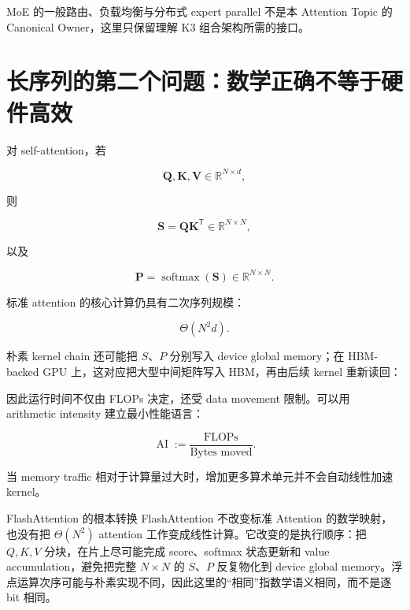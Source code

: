 \documentclass[profile=standard,twoside=false]{ipara-handbook}
\begin{document}
MoE 的一般路由、负载均衡与分布式 expert parallel 不是本 Attention Topic 的 Canonical Owner，这里只保留理解 K3 组合架构所需的接口。

\section{长序列的第二个问题：数学正确不等于硬件高效}

对 self-attention，若

$$
\boldsymbol{Q},\boldsymbol{K},\boldsymbol{V}\in\mathbb{R}^{N\times d},
$$

则

$$
\boldsymbol{S}=\boldsymbol{Q}\boldsymbol{K}^{\mathsf T}
\in\mathbb{R}^{N\times N},
$$

以及

$$
\boldsymbol{P}=\operatorname{softmax}(\boldsymbol{S})
\in\mathbb{R}^{N\times N}.
$$

标准 attention 的核心计算仍具有二次序列规模：

$$
\Theta(N^2d).
$$

朴素 kernel chain 还可能把 $S$、$P$ 分别写入 device global memory；在 HBM-backed GPU 上，这对应把大型中间矩阵写入 HBM，再由后续 kernel 重新读回：

\begin{processchain}
\end{processchain}

因此运行时间不仅由 FLOPs 决定，还受 data movement 限制。可以用 arithmetic intensity 建立最小性能语言：

$$
\operatorname{AI}
:=\frac{\text{FLOPs}}{\text{Bytes moved}}.
$$

当 memory traffic 相对于计算量过大时，增加更多算术单元并不会自动线性加速 kernel。

\begin{mechanism}{FlashAttention 的根本转换}
FlashAttention 不改变标准 Attention 的数学映射，也没有把 $\Theta(N^2)$ attention 工作变成线性计算。它改变的是执行顺序：把 $Q,K,V$ 分块，在片上尽可能完成 score、softmax 状态更新和 value accumulation，避免把完整 $N\times N$ 的 $S$、$P$ 反复物化到 device global memory。浮点运算次序可能与朴素实现不同，因此这里的“相同”指数学语义相同，而不是逐 bit 相同。
\end{mechanism}

\begin{handbookdiagram}
\centering

\end{handbookdiagram}
\end{document}
